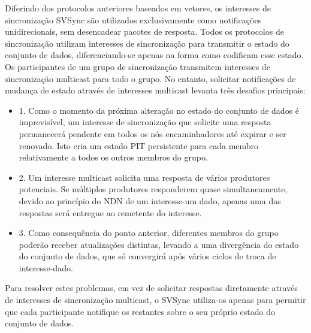     Diferindo dos protocolos anteriores baseados em vetores, os interesses de sincronização \gls{SVSync} são utilizados exclusivamente como notificações unidirecionais, sem desencadear pacotes de resposta. Todos os protocolos de sincronização utilizam interesses de sincronização para transmitir o estado do conjunto de dados, diferenciando-se apenas na forma como codificam esse estado.
    Os participantes de um grupo de sincronização transmitem interesses de sincronização multicast para todo o grupo. No entanto, solicitar notificações de mudança de estado através de interesses multicast levanta três desafios principais:
    \begin{itemize}
        \item 1. Como o momento da próxima alteração no estado do conjunto de dados é imprevisível, um interesse de sincronização que solicite uma resposta permanecerá pendente em todos os nós encaminhadores até expirar e ser renovado. Isto cria um estado PIT persistente para cada membro relativamente a todos os outros membros do grupo.
        \item 2. Um interesse multicast solicita uma resposta de vários produtores potenciais. Se múltiplos produtores responderem quase simultaneamente, devido ao princípio do NDN de um interesse-um dado, apenas uma das respostas será entregue ao remetente do interesse.
        \item 3.	Como consequência do ponto anterior, diferentes membros do grupo poderão receber atualizações distintas, levando a uma divergência do estado do conjunto de dados, que só convergirá após vários ciclos de troca de interesse-dado.
    \end{itemize}
    Para resolver estes problemas, em vez de solicitar respostas diretamente através de interesses de sincronização multicast, o \gls{SVSync} utiliza-os apenas para permitir que cada participante notifique os restantes sobre o seu próprio estado do conjunto de dados. 
